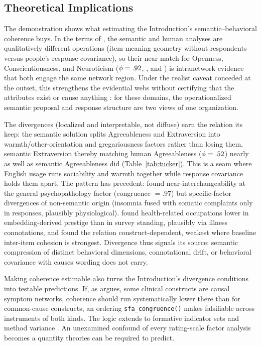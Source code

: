 \subsection{Theoretical Implications}

The demonstration shows what estimating the Introduction's
semantic--behavioral coherence buys. In the terms of
\citet{cronbach-meehl-1955}, the semantic and human analyses are
qualitatively different operations (item-meaning geometry without
respondents versus \valNHuman{} people's response covariance), so their
near-match for Openness, Conscientiousness, and Neuroticism ($\phi =
.92$, \valPhiC, and \valPhiN) is intranetwork evidence that both engage the same
network region. Under the realist caveat conceded at the outset, this
strengthens the evidential webs without certifying that the attributes
exist or cause anything \citep{borsboom-etal-2004}: for these domains,
the operationalized semantic proposal and response structure are two
views of one organization.

The divergences (localized and interpretable, not diffuse) earn the
relation its keep: the semantic solution splits Agreeableness and
Extraversion into warmth/other-orientation and gregariousness factors
rather than losing them, semantic Extraversion thereby matching human
Agreeableness ($\phi = .52$) nearly as well as semantic Agreeableness did
(Table~\ref{tab:tucker}). This is a seam where English usage runs sociability
and warmth together while response covariance holds them apart. The
pattern has precedent: \citet{kojima-etal-2026} found
near-interchangeability at the general psychopathology factor (congruence
$= .97$) but specific-factor divergences of non-semantic origin (insomnia
fused with somatic complaints only in responses, plausibly
physiological). \citet{kmetty-etal-2021} found health-related occupations
lower in embedding-derived prestige than in survey standing, plausibly
via illness connotations, and \citet{zhang-qiu-2026} found the relation
construct-dependent, weakest where baseline inter-item cohesion is
strongest. Divergence thus signals its source: semantic compression of
distinct behavioral dimensions, connotational drift, or behavioral
covariance with causes wording does not carry.

Making coherence estimable also turns the Introduction's divergence
conditions into testable predictions. If, as \citet{borsboom-2008}
argues, some clinical constructs are causal symptom networks, coherence
should run systematically lower there than for common-cause
constructs, an ordering \texttt{sfa\_congruence()} makes falsifiable
across instruments of both kinds. The logic extends to formative
indicator sets \citep{bollen-lennox-1991} and method variance
\citep{messick-1995}. An unexamined confound of every rating-scale factor
analysis becomes a quantity theories can be required to predict.
